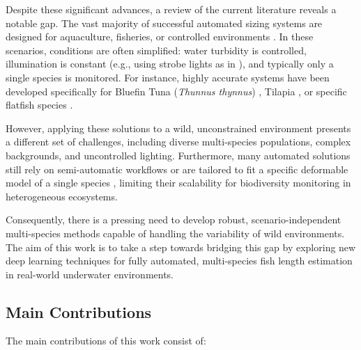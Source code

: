\documentclass[utf8]{FrontiersinHarvard} %
\begin{document}
Despite these significant advances, a review of the current literature reveals a notable gap. The vast majority of successful automated sizing systems are designed for aquaculture, fisheries, or controlled environments \citep{Yang2021, JansiRani2024}. In these scenarios, conditions are often simplified: water turbidity is controlled, illumination is constant (e.g., using strobe lights as in \citep{Garcia2020}), and typically only a single species is monitored. For instance, highly accurate systems have been developed specifically for Bluefin Tuna (\textit{Thunnus thynnus}) \citep{Muoz-Benavent2022}, Tilapia \citep{Abinaya2022}, or specific flatfish species \citep{Zhang2024}.

However, applying these solutions to a wild, unconstrained environment presents a different set of challenges, including diverse multi-species populations, complex backgrounds, and uncontrolled lighting. Furthermore, many automated solutions still rely on semi-automatic workflows or are tailored to fit a specific deformable model of a single species \citep{Mei2021}, limiting their scalability for biodiversity monitoring in heterogeneous ecosystems. 

Consequently, there is a pressing need to develop robust, scenario-independent multi-species methods capable of handling the variability of wild environments. The aim of this work is to take a step towards bridging this gap by exploring new deep learning techniques for fully automated, multi-species fish length estimation in real-world underwater environments.



\subsection{Main Contributions}\label{subsec::contrib}


The main contributions of this work consist of:
\end{document}

